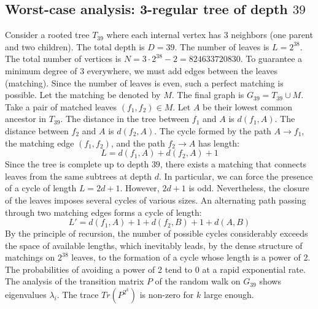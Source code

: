 \documentclass[11pt,a4paper]{article}
\begin{document}
\subsection{Worst-case analysis: 3-regular tree of depth $39$}
Consider a rooted tree $T_{39}$ where each internal vertex has 3 neighbors (one parent and two children).
The total depth is $D = 39$.
The number of leaves is $L = 2^{38}$.
The total number of vertices is $N = 3 \cdot 2^{38} - 2 = 824633720830$.
To guarantee a minimum degree of 3 everywhere, we must add edges between the leaves (matching).
Since the number of leaves is even, such a perfect matching is possible.
Let the matching be denoted by $M$. The final graph is $G_{39} = T_{39} \cup M$.
Take a pair of matched leaves $(f_1, f_2) \in M$.
Let $A$ be their lowest common ancestor in $T_{39}$.
The distance in the tree between $f_1$ and $A$ is $d(f_1, A)$.
The distance between $f_2$ and $A$ is $d(f_2, A)$.
The cycle formed by the path $A \to f_1$, the matching edge $(f_1, f_2)$, and the path $f_2 \to A$ has length:
$$ L = d(f_1, A) + d(f_2, A) + 1 $$
Since the tree is complete up to depth $39$, there exists a matching that connects leaves from the same subtrees at depth $d$.
In particular, we can force the presence of a cycle of length $L = 2d + 1$. However, $2d+1$ is odd.
Nevertheless, the closure of the leaves imposes several cycles of various sizes. An alternating path passing through two matching edges forms a cycle of length:
$$ L' = d(f_1, A) + 1 + d(f_2, B) + 1 + d(A, B) $$
By the principle of recursion, the number of possible cycles considerably exceeds the space of available lengths, which inevitably leads, by the dense structure of matchings on $2^{38}$ leaves, to the formation of a cycle whose length is a power of 2. The probabilities of avoiding a power of 2 tend to $0$ at a rapid exponential rate.
The analysis of the transition matrix $P$ of the random walk on $G_{39}$ shows eigenvalues $\lambda_i$. The trace $Tr(P^{2^k})$ is non-zero for $k$ large enough.
\end{document}
